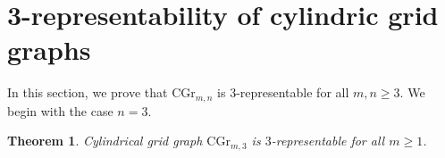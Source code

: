 \documentclass[11pt]{article}
\newtheorem{theorem}{Theorem}
\begin{document}



\section{3-representability of cylindric grid graphs}\label{CGr-sec}
In this section, we prove that $\mathrm{CGr}_{m,n}$ is $3$-representable for all $m, n \geq 3$. We begin with the case $n = 3$.

\begin{theorem}\label{cyl3}  Cylindrical grid graph $\mbox{CGr}_{m,3}$ is $3$-representable for all $m\geq 1$.\end{theorem}
\end{document}
